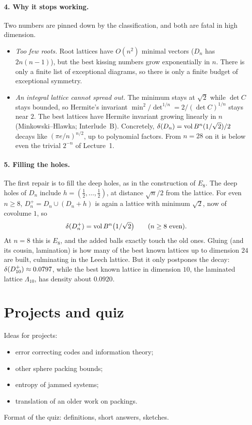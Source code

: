 \paragraph{4. Why it stops working.} Two numbers are pinned down by the classification, and both are
fatal in high dimension.
\begin{itemize}
\item \emph{Too few roots.} Root lattices have $O(n^2)$ minimal vectors ($D_n$ has $2n(n-1)$), but
  the best kissing numbers grow exponentially in $n$. There is only a finite list of exceptional
  diagrams, so there is only a finite budget of exceptional symmetry.
\item \emph{An integral lattice cannot spread out.} The minimum stays at $\sqrt2$ while $\det C$ stays
  bounded, so Hermite's invariant $\min^2/\det^{1/n}=2/(\det C)^{1/n}$ stays near $2$. The best
  lattices have Hermite invariant growing linearly in $n$ (Minkowski--Hlawka; Interlude~B). Concretely,
  $\delta(D_n)=\operatorname{vol}B^n(1/\sqrt2)/2$ decays like $(\pi e/n)^{n/2}$, up to polynomial factors. From $n=28$ on it is below even the trivial
  $2^{-n}$ of Lecture~1.
\end{itemize}

\paragraph{5. Filling the holes.} The first repair is to fill the deep holes, as in the construction of
$E_8$. The deep holes of $D_n$ include $h=(\frac12,\dots,\frac12)$, at distance $\sqrt n/2$ from the
lattice. For even $n\ge8$, $D_n^+=D_n\cup(D_n+h)$ is again a lattice with minimum $\sqrt2$, now of
covolume $1$, so
\[
  \delta(D_n^+)=\operatorname{vol}B^n\big(1/\sqrt2\big)\qquad(n\ge8\text{ even}).
\]
At $n=8$ this is $E_8$, and the added balls exactly touch the old ones. Gluing (and its cousin,
lamination) is how many of the best known lattices up to dimension $24$ are built, culminating in the Leech
lattice. But it only postpones the decay: $\delta(D_{10}^+)\approx0.0797$, while the best known lattice in
dimension $10$, the laminated lattice $\Lambda_{10}$, has density about $0.0920$.

\section*{Projects and quiz}
Ideas for projects:
\begin{itemize}
  \item error correcting codes and information theory;
  \item other sphere packing bounds;
  \item entropy of jammed systems;
  \item translation of an older work on packings. 
\end{itemize}
Format of the quiz: definitions, short answers, sketches.
